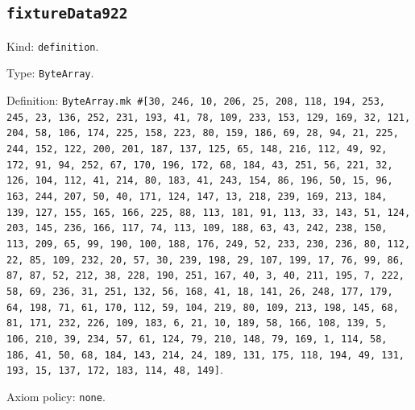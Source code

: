 \documentclass[11pt]{article}
\begin{document}
\subsection*{\texttt{fixtureData922}}
\noindent Kind: \texttt{definition}.\par
\noindent Type: \texttt{ByteArray}.\par
\noindent Definition: \texttt{ByteArray.mk \#[30, 246, 10, 206, 25, 208, 118, 194, 253, 245, 23, 136, 252, 231, 193, 41, 78, 109, 233, 153, 129, 169, 32, 121, 204, 58, 106, 174, 225, 158, 223, 80, 159, 186, 69, 28, 94, 21, 225, 244, 152, 122, 200, 201, 187, 137, 125, 65, 148, 216, 112, 49, 92, 172, 91, 94, 252, 67, 170, 196, 172, 68, 184, 43, 251, 56, 221, 32, 126, 104, 112, 41, 214, 80, 183, 41, 243, 154, 86, 196, 50, 15, 96, 163, 244, 207, 50, 40, 171, 124, 147, 13, 218, 239, 169, 213, 184, 139, 127, 155, 165, 166, 225, 88, 113, 181, 91, 113, 33, 143, 51, 124, 203, 145, 236, 166, 117, 74, 113, 109, 188, 63, 43, 242, 238, 150, 113, 209, 65, 99, 190, 100, 188, 176, 249, 52, 233, 230, 236, 80, 112, 22, 85, 109, 232, 20, 57, 30, 239, 198, 29, 107, 199, 17, 76, 99, 86, 87, 87, 52, 212, 38, 228, 190, 251, 167, 40, 3, 40, 211, 195, 7, 222, 58, 69, 236, 31, 251, 132, 56, 168, 41, 18, 141, 26, 248, 177, 179, 64, 198, 71, 61, 170, 112, 59, 104, 219, 80, 109, 213, 198, 145, 68, 81, 171, 232, 226, 109, 183, 6, 21, 10, 189, 58, 166, 108, 139, 5, 106, 210, 39, 234, 57, 61, 124, 79, 210, 148, 79, 169, 1, 114, 58, 186, 41, 50, 68, 184, 143, 214, 24, 189, 131, 175, 118, 194, 49, 131, 193, 15, 137, 172, 183, 114, 48, 149]}.\par
\noindent Axiom policy: \texttt{none}.\par
\end{document}
